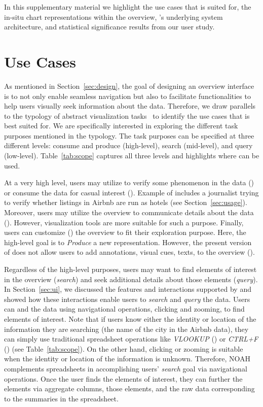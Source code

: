 In this supplementary material we highlight the use cases that \noah
is suited for, the in-situ chart representations within
the overview, \noah’s underlying system architecture,
and statistical significance results from our user study.
\section*{\noah Use Cases}
As mentioned in Section~\ref{sec:design}, the goal of designing 
an overview interface is to 
not only enable seamless navigation 
but also to facilitate functionalities to help users visually seek information about the data. Therefore, we draw parallels to the typology of abstract visualization tasks~\cite{brehmer2013multi} to identify the use cases that \noah is best suited for. 
We are specifically interested in exploring the different task purposes mentioned in the typology. The task purposes can be specified at three different levels: consume and produce (high-level), search (mid-level), and query (low-level). Table~\ref{tab:scope} captures all three levels and highlights where \noah can be used.

At a very high level, users may utilize \noah to verify some phenomenon in the data () or consume the data for casual interest (). Example of  includes a journalist trying to verify whether listings in Airbnb are run as hotels (see Section~\ref{sec:usage}). 
Moreover, users may utilize the overview to communicate details about the data (). 
However, visualization tools are more suitable for such a purpose. 
Finally, users can customize () the overview to fit their exploration purpose. Here, the high-level goal is to \emph{Produce} a new representation. 
However, the present version of \noah does not allow users to add annotations, \eg visual cues, texts, to the overview ().

Regardless of the high-level purposes, users may want to find elements of interest in the overview (\emph{search}) and seek additional details about those elements (\emph{query}). 
In Section~\ref{sec:ui}, we discussed the features and interactions supported by \noah and showed how these interactions enable users to \emph{search} and \emph{query} the data. Users can  and  the data using navigational operations, \eg clicking and zooming, to find elements of interest. 
Note that if users know either the identity or location of the information they are searching (\eg the name of the city in the Airbnb data), 
they can simply use traditional spreadsheet operations like \emph{VLOOKUP} () or \emph{CTRL+F} () (see Table~\ref{tab:scope}). 
On the other hand, clicking or zooming is suitable when the identity or location of the information is unknown. Therefore, NOAH complements spreadsheets in accomplishing users’ \emph{search} goal via navigational operations. 
Once the user finds the elements of interest, they can further  the elements via aggregate columns,  those elements, and  the raw data corresponding to the summaries in the spreadsheet.

